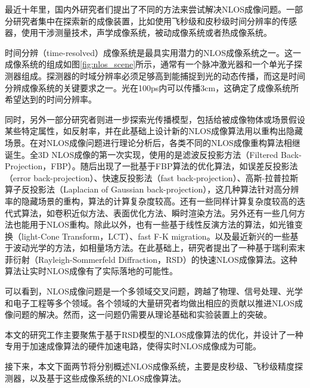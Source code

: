 \documentclass[master]{shtthesis}             %
\begin{document}
最近十年里，国内外研究者们提出了不同的方法来尝试解决NLOS成像问题。一部分研究者集中在探索新的成像装置，比如使用飞秒级和皮秒级时间分辨率的传感器\citep{Velten2012,Otoole2018,Liu2019,DavidB.Lindell2019}，使用干涉测量技术\citep{bertolotti2012non,katz2014non}，声学成像系统\citep{lindell2019acoustic}，被动成像系统\citep{bouman2017turning,saunders2019computational,boger2019passive}或者热成像系统。

时间分辨（time-resolved）成像系统是最具实用潜力的NLOS成像系统之一。这一成像系统的组成如图\ref{fig:nlos_scene}所示，通常有一个脉冲激光器和一个单光子探测器组成。探测器的时域分辨率必须足够高到能捕捉到光的动态传播，而这是时间分辨成像系统的关键要求之一\citep{faccio2018trillion}。光在100ps内可以传播3cm，这确定了成像系统所希望达到的时间分辨率。

同时，另外一部分研究者则进一步探索光传播模型，包括给被成像物体或场景假设某些特定属性，如反射率，并在此基础上设计新的NLOS成像算法用以重构出隐藏场景。在对NLOS成像问题进行理论分析后\citep{ramesh20085d}，各类不同的NLOS成像重构算法相继诞生。全3D NLOS成像的第一次实现，使用的是滤波反投影方法（Filtered Back-Projection，FBP）\citep{Velten2012}。随后出现了一批基于FBP算法的优化算法，如误差反投影法（error back-projection）\citep{LaManna2019}、快速反投影法（fast back-projection）\citep{Arellano2017}、高斯-拉普拉斯算子反投影法（Laplacian of Gaussian back-projection）\citep{Laurenzis2014}，这几种算法针对高分辨率的隐藏场景的重构，算法的计算复杂度较高。还有一些同样计算复杂度较高的迭代式算法，如卷积近似方法\citep{Ahn2019}、表面优化方法\citep{Tsai2019}、瞬时渲染方法\citep{Iseringhausen2018}。另外还有一些几何方法也能用于NLOS重构\citep{Tsai2017,Xin2019}。除此以外，也有一些基于线性反演方法的算法，如光锥变换（light-Cone Transform，LCT）\citep{Otoole2018}、fast F-K migration\citep{DavidB.Lindell2019}。以及最近新兴的一些基于波动光学的方法，如相量场方法\citep{Liu2019,Teichman2019,Dove2019,Liu2020}。在此基础上，研究者提出了一种基于瑞利索末菲衍射（Rayleigh-Sommerfeld Diffraction，RSD）的快速NLOS成像算法\citep{Liu}。这种算法让实时NLOS成像有了实际落地的可能性。

可以看到，NLOS成像问题是一个多领域交叉问题，跨越了物理、信号处理、光学和电子工程等多个领域。各个领域的大量研究者均做出相应的贡献以推进NLOS成像问题的解决。然而，这一问题仍需要从理论基础和实验装置上的突破。

本文的研究工作主要聚焦于基于RSD模型的NLOS成像算法的优化，并设计了一种专用于加速成像算法的硬件加速电路，使得实时NLOS成像成为可能。

接下来，本文下面两节将分别概述NLOS成像系统，主要是皮秒级、飞秒级精度探测器，以及基于这些成像系统的NLOS成像算法。
\end{document}
